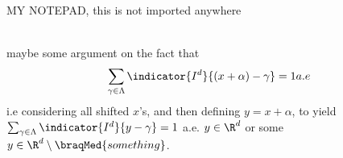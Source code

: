 


MY NOTEPAD, this is not imported anywhere

\\
maybe some argument on the fact that 
\begin{align*}
    \sum_{\gamma \in \Lambda} \indicator{I^d}{(x+\alpha) - \gamma} = 1 a.e 
\end{align*}
i.e considering all shifted $x$'s, and then defining $y=x+\alpha$, to yield $\sum_{\gamma \in \Lambda} \indicator{I^d}{y - \gamma} = 1$ a.e. $y\in \R^d$ or some $y\in \R^d\setminus \braqMed{something}$. 

